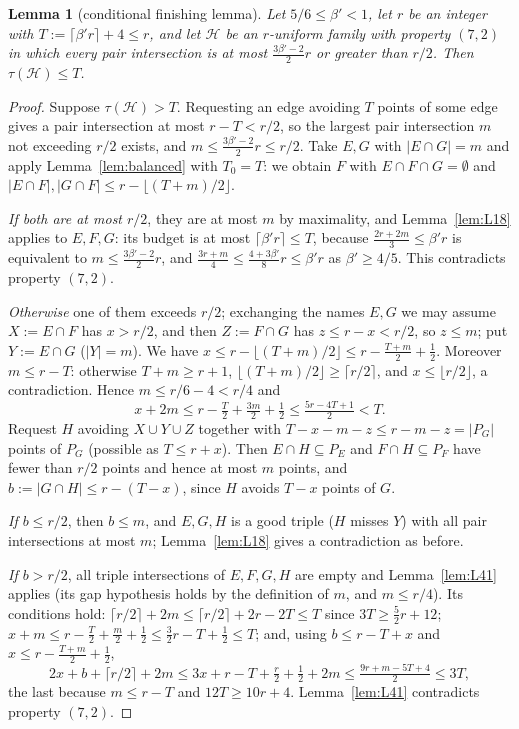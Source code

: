 \documentclass[11pt]{amsart}
\newtheorem{lemma}[theorem]{Lemma}
\theoremstyle{definition}
\theoremstyle{remark}
\newcommand{\cH}{\mathcal H}
\newcommand{\ceil}[1]{\lceil #1\rceil}
\newcommand{\floor}[1]{\lfloor #1\rfloor}
\begin{document}
\begin{lemma}[conditional finishing lemma]\label{lem:finish}
Let $5/6\le\beta'<1$, let $r$ be an integer with $T:=\ceil{\beta' r}+4\le r$, and let $\cH$ be an $r$-uniform family with property $(7,2)$ in which every pair intersection is at most $\tfrac{3\beta'-2}{2}r$ or greater than $r/2$. Then $\tau(\cH)\le T$.
\end{lemma}
\begin{proof}
Suppose $\tau(\cH)>T$. Requesting an edge avoiding $T$ points of some edge gives a pair intersection at most $r-T<r/2$, so the largest pair intersection $m$ not exceeding $r/2$ exists, and $m\le\tfrac{3\beta'-2}{2}r\le r/2$. Take $E,G$ with $|E\cap G|=m$ and apply Lemma~\ref{lem:balanced} with $T_0=T$: we obtain $F$ with $E\cap F\cap G=\emptyset$ and $|E\cap F|,|G\cap F|\le r-\floor{(T+m)/2}$.

\emph{If both are at most $r/2$}, they are at most $m$ by maximality, and Lemma~\ref{lem:L18} applies to $E,F,G$: its budget is at most $\ceil{\beta' r}\le T$, because $\tfrac{2r+2m}{3}\le\beta' r$ is equivalent to $m\le\tfrac{3\beta'-2}{2}r$, and $\tfrac{3r+m}{4}\le\tfrac{4+3\beta'}{8}r\le\beta' r$ as $\beta'\ge4/5$. This contradicts property $(7,2)$.

\emph{Otherwise} one of them exceeds $r/2$; exchanging the names $E,G$ we may assume $X:=E\cap F$ has $x>r/2$, and then $Z:=F\cap G$ has $z\le r-x<r/2$, so $z\le m$; put $Y:=E\cap G$ ($|Y|=m$). We have $x\le r-\floor{(T+m)/2}\le r-\tfrac{T+m}{2}+\tfrac12$. Moreover $m\le r-T$: otherwise $T+m\ge r+1$, $\floor{(T+m)/2}\ge\ceil{r/2}$, and $x\le\floor{r/2}$, a contradiction. Hence $m\le r/6-4<r/4$ and
\[
x+2m\le r-\tfrac T2+\tfrac{3m}{2}+\tfrac12\le\tfrac{5r-4T+1}{2}<T .
\]
Request $H$ avoiding $X\cup Y\cup Z$ together with $T-x-m-z\le r-m-z=|P_G|$ points of $P_G$ (possible as $T\le r+x$). Then $E\cap H\subseteq P_E$ and $F\cap H\subseteq P_F$ have fewer than $r/2$ points and hence at most $m$ points, and $b:=|G\cap H|\le r-(T-x)$, since $H$ avoids $T-x$ points of $G$.

\emph{If $b\le r/2$}, then $b\le m$, and $E,G,H$ is a good triple ($H$ misses $Y$) with all pair intersections at most $m$; Lemma~\ref{lem:L18} gives a contradiction as before.

\emph{If $b>r/2$}, all triple intersections of $E,F,G,H$ are empty and Lemma~\ref{lem:L41} applies (its gap hypothesis holds by the definition of $m$, and $m\le r/4$). Its conditions hold: $\ceil{r/2}+2m\le\ceil{r/2}+2r-2T\le T$ since $3T\ge\tfrac52r+12$; $x+m\le r-\tfrac T2+\tfrac m2+\tfrac12\le\tfrac32r-T+\tfrac12\le T$; and, using $b\le r-T+x$ and $x\le r-\tfrac{T+m}{2}+\tfrac12$,
\[
2x+b+\ceil{r/2}+2m\le 3x+r-T+\tfrac r2+\tfrac12+2m\le\tfrac{9r+m-5T+4}{2}\le3T,
\]
the last because $m\le r-T$ and $12T\ge10r+4$. Lemma~\ref{lem:L41} contradicts property $(7,2)$.
\end{proof}
\end{document}
